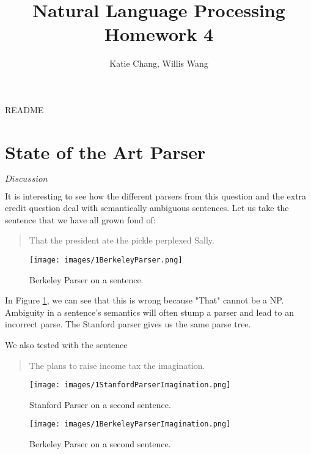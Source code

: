 \documentclass[12pt, letterpaper]{article}
\title{Natural Language Processing Homework 4}
\author{Katie Chang, Willis Wang}
\begin{document}
\maketitle

README

\section{State of the Art Parser}
$Discussion$

It is interesting to see how the different parsers from this question and the extra credit question deal with semantically ambiguous sentences. Let us take the sentence that we have all grown fond of:

\begin{quote}
That the president ate the pickle perplexed Sally.
\end{quote}

\begin{figure}
\begin{center}
\texttt{[image: images/1BerkeleyParser.png]}
\end{center}
\caption{Berkeley Parser on a sentence.}
\label{BParser}
\end{figure}

In Figure \ref{BParser}, we can see that this is wrong because "That" cannot be a NP. Ambiguity in a sentence's semantics will often stump a parser and lead to an incorrect parse. The Stanford parser gives us the same parse tree.

We also tested with the sentence 
\begin{quote}
The plans to raise income tax the imagination.
\end{quote}

\begin{figure}
\begin{center}
\texttt{[image: images/1StanfordParserImagination.png]}
\end{center}
\caption{Stanford Parser on a second sentence.}
\label{SParserImagination}
\end{figure}

\begin{figure}
\begin{center}
\texttt{[image: images/1BerkeleyParserImagination.png]}
\end{center}
\caption{Berkeley Parser on a second sentence.}
\label{BParserImagination}
\end{figure}
\end{document}
